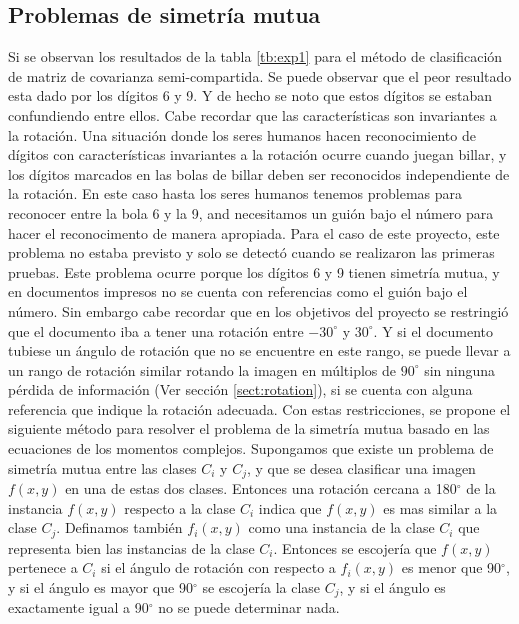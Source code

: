 \documentclass[a4paper, 11pt, oneside]{report}
\begin{document}
\subsection{Problemas de simetría mutua}
\label{sect:mutualSym}

Si se observan los resultados de la tabla \ref{tb:exp1} para el método de clasificación de matriz de covarianza semi-compartida. Se puede observar que el peor resultado esta dado por los dígitos 6 y 9. Y de hecho se noto que estos dígitos se estaban confundiendo entre ellos. 
Cabe recordar que las características son invariantes a la rotación. Una situación donde los seres humanos hacen reconocimiento de dígitos con características invariantes a la rotación ocurre cuando juegan billar, y los dígitos marcados en las bolas de billar deben ser reconocidos independiente de la rotación. En este caso hasta los seres humanos tenemos problemas para reconocer entre la bola 6 y la 9, and necesitamos un guión bajo el número para hacer el reconocimento de manera apropiada.\newline \newline
Para el caso de este proyecto, este problema no estaba previsto y solo se detectó cuando se realizaron las primeras pruebas. Este problema ocurre porque los dígitos 6 y 9 tienen simetría mutua, y en documentos impresos no se cuenta con referencias como el guión bajo el número. Sin embargo cabe recordar que en los objetivos del proyecto se restringió que el documento iba a tener una rotación entre $-30^\circ$ y $30^\circ$. Y si el documento tubiese un ángulo de rotación que no se encuentre en este rango, se puede llevar a un rango de rotación similar rotando la imagen en múltiplos de $90^\circ$ sin ninguna pérdida de información (Ver sección \ref{sect:rotation}), si se cuenta con alguna referencia que indique la rotación adecuada. \newline \newline
Con estas restricciones, se propone el siguiente método para resolver el problema de la simetría mutua basado en las ecuaciones de los momentos complejos. Supongamos que existe un problema de simetría mutua entre las clases $C_i$ y $C_j$, y que se desea clasificar una imagen $f(x,y)$ en una de estas dos clases. Entonces una rotación cercana a 180$^\circ$ de la instancia $f(x,y)$ respecto a la clase $C_i$ indica que $f(x,y)$ es mas similar a la clase $C_j$. Definamos también $f_i(x,y)$ como una instancia de la clase $C_i$ que representa bien las instancias de la clase $C_i$. Entonces se escojería que $f(x,y)$ pertenece a $C_i$ si el ángulo de rotación con respecto a $f_i(x,y)$ es menor que 90$^\circ$, y si el ángulo es mayor que 90$^\circ$ se escojería la clase $C_j$, y si el ángulo es exactamente igual a 90$^\circ$ no se puede determinar nada. \newline \newline
\end{document}
